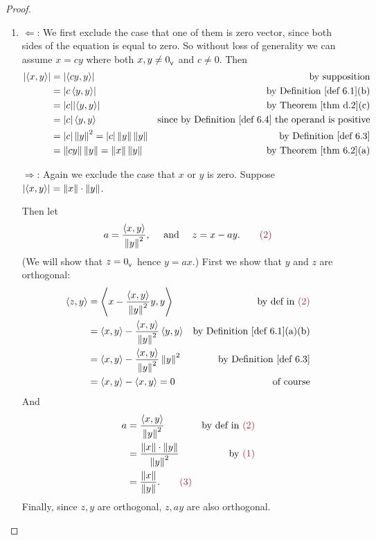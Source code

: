 \begin{proof} \ 

\begin{enumerate}
\item
\(\Longleftarrow\):
We first exclude the case that one of them is zero vector, since both sides of the equation is equal to zero.
So without loss of generality we can assume \(x = cy\) where both \(x, y \ne 0_{_{\textsf{V}}}\) and \(c \ne 0\).
Then
\begin{align*}
    \abs{\LG x, y \RG} & = \abs{\LG cy, y \RG} & \text{by supposition} \\
        & = \abs{c \LG y, y \RG} & \text{by \DEF{6.1}(b)} \\
        & = \abs{c} \abs{\LG y, y \RG} & \text{by \THM{d.2}(c)} \\
        & = \abs{c} \LG y, y \RG & \text{since by \DEF{6.4} the operand is positive} \\
        & = \abs{c} \norm{y}^2 = \abs{c} \norm{y} \norm{y} & \text{by \DEF{6.3}} \\
        & = \norm{cy} \norm{y} = \norm{x} \norm{y} & \text{by \THM{6.2}(a)}
\end{align*}

\(\Longrightarrow\):
Again we exclude the case that \(x\) or \(y\) is zero.
Suppose \(\lvert \left< x, y \right> \rvert = \left\lVert x\right\rVert \cdot \left\lVert y\right\rVert\). 

Then let
\[
    a = \frac{\LG x, y \RG}{\norm{y}^2}, \quad \text{ and } \quad z = x - ay. \quad \quad \MAROON{(2)}
\]
(We will show that \(z = 0_{_{\textsf{V}}}\) hence \(y = ax\).)
First we show that \(y\) and \(z\) are orthogonal:
\begin{align*}
    \LG z, y \RG & = \LG x - \frac{\LG x, y \RG}{\norm{y}^2}y , y \RG & \text{by def in \MAROON{(2)}} \\
        & = \LG x, y \RG - \frac{\LG x, y \RG}{\norm{y}^2} \LG y, y \RG & \text{by \DEF{6.1}(a)(b)} \\
        & = \LG x, y \RG - \frac{\LG x, y \RG}{\norm{y}^2} \norm{y}^2 & \text{by \DEF{6.3}} \\
        & = \LG x, y \RG - \LG x, y \RG = 0 & \text{of course}
\end{align*}
And
\begin{align*}
    a & = \frac{\LG x, y \RG}{\norm{y}^2} & \text{by def in \MAROON{(2)}} \\
      & = \frac{\norm{x} \cdot \norm{y}}{\norm{y}^2} & \text{by \MAROON{(1)}} \\
      & = \frac{\norm{x}}{\norm{y}}. \quad \quad \MAROON{(3)}
\end{align*}
Finally, since \(z, y\) are orthogonal, \(z, ay\) are also orthogonal. 


\end{enumerate}
\end{proof}
